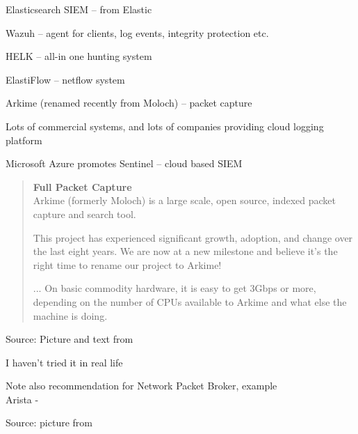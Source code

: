 \documentclass[Screen16to9,17pt]{foils}
\begin{document}
\begin{list2}
\item Elasticsearch SIEM -- from Elastic
\item Wazuh -- agent for clients, log events, integrity protection etc.
\item HELK -- all-in one hunting system
\item ElastiFlow -- netflow system
\item Arkime (renamed recently from Moloch) -- packet capture
\end{list2}

Lots of commercial systems, and lots of companies providing cloud logging platform

Microsoft Azure promotes Sentinel -- cloud based SIEM\\ {\footnotesize
{}}



\begin{quote}\small
{\bf Full Packet Capture}\\
Arkime (formerly Moloch) is a large scale, open source, indexed packet capture and search tool.

This project has experienced significant growth, adoption, and change over the last eight years. We are now at a new milestone and believe it’s the right time to rename our project to Arkime!

...
On basic commodity hardware, it is easy to get 3Gbps or more, depending on the number of CPUs available to Arkime and what else the machine is doing.
\end{quote}
Source: Picture and text from 

\begin{list2}
\item I haven't tried it in real life
\item Note also recommendation for Network Packet Broker, example\\
Arista - 
\end{list2}





Source: picture from 
\end{document}
